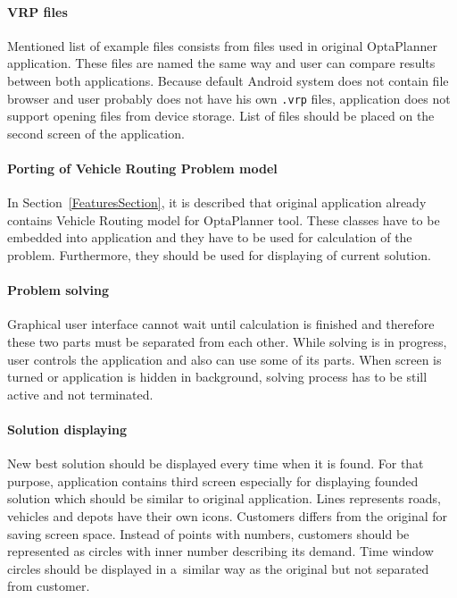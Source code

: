 \paragraph{VRP files}
Mentioned list of example files consists from files used in original OptaPlanner application. These files are named the
same way and user can compare results between both applications. Because default Android system does not contain file
browser and user probably does not have his own \texttt{.vrp} files, application does not support opening files from
device storage. List of files should be placed on the second screen of the application.

\paragraph{Porting of Vehicle Routing Problem model}
In Section~\ref{FeaturesSection}, it is described that original application already contains Vehicle Routing model for
OptaPlanner tool. These classes have to be embedded into application and they have to be used for calculation of the
problem. Furthermore, they should be used for displaying of current solution.

\paragraph{Problem solving}
Graphical user interface cannot wait until calculation is finished and therefore these two parts must be separated from
each other. While solving is in progress, user controls the application and also can use some of its parts. When screen
is turned or application is hidden in background, solving process has to be still active and not terminated.

\paragraph{Solution displaying}
New best solution should be displayed every time when it is found. For that purpose, application contains third screen
especially for displaying founded solution which should be similar to original application. Lines represents roads,
vehicles and depots have their own icons. Customers differs from the original for saving screen space. Instead of points
with numbers, customers should be represented as circles with inner number describing its demand. Time window circles
should be displayed in a~similar way as the original but not separated from customer.

